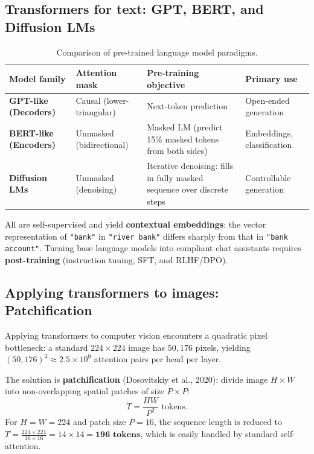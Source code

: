 \documentclass[11pt,a4paper]{article}
\newcommand{\slides}[1]{\par\nopagebreak\noindent{\normalfont\small\emph{(slides #1)}}\par\nopagebreak\vspace{2pt}}
\theoremstyle{definition}
\theoremstyle{plain}
\begin{document}
\subsection{Transformers for text: GPT, BERT, and Diffusion LMs}\slides{76 / 84}
\begin{table}[H]
\centering\small
\renewcommand{\arraystretch}{1.2}
\begin{tabular}{@{}p{3cm}p{3cm}p{4cm}p{3cm}@{}}
\toprule
\textbf{Model family} & \textbf{Attention mask} & \textbf{Pre-training objective} & \textbf{Primary use} \\
\midrule
\textbf{GPT-like (Decoders)} & Causal (lower-triangular) & Next-token prediction & Open-ended generation \\
\textbf{BERT-like (Encoders)} & Unmasked (bidirectional) & Masked LM (predict 15\% masked tokens from both sides) & Embeddings, classification \\
\textbf{Diffusion LMs} & Unmasked (denoising) & Iterative denoising: fills in fully masked sequence over discrete steps & Controllable generation \\
\bottomrule
\end{tabular}
\caption{Comparison of pre-trained language model paradigms.}\label{tab:text_models}
\end{table}
All are self-supervised and yield \textbf{contextual embeddings}: the vector representation of \texttt{"bank"} in \texttt{"river bank"} differs sharply from that in \texttt{"bank account"}. Turning base language models into compliant chat assistants requires \textbf{post-training} (instruction tuning, SFT, and RLHF/DPO).

\subsection{Applying transformers to images: Patchification}\slides{77 / 84}
Applying transformers to computer vision encounters a quadratic pixel bottleneck: a standard $224 \times 224$ image has $50{,}176$ pixels, yielding $(50{,}176)^2 \approx 2.5 \times 10^9$ attention pairs per head per layer.

The solution is \textbf{patchification} (Dosovitskiy et al., 2020): divide image $H \times W$ into non-overlapping spatial patches of size $P \times P$:
\begin{equation}\label{eq:vit_patches}
T = \frac{H W}{P^2} \text{ tokens}.
\end{equation}
For $H=W=224$ and patch size $P=16$, the sequence length is reduced to $T = \frac{224 \times 224}{16 \times 16} = 14 \times 14 = \mathbf{196 \text{ tokens}}$, which is easily handled by standard self-attention.
\end{document}
